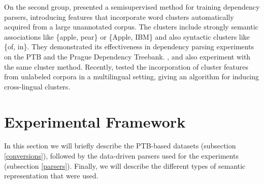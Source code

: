 \documentclass[11pt]{article}
\begin{document}
On the second group,  presented a semisupervised method for training dependency parsers, introducing features that incorporate word clusters automatically acquired from a large unannotated corpus. The clusters include strongly semantic associations like \{apple, pear\} or \{Apple, IBM\} and also syntactic clusters like \{of, in\}. They demonstrated its effectiveness in  dependency parsing experiments on the PTB and the Prague Dependency Treebank.
,  and  also experiment with the same cluster method.
Recently,  tested the incorporation of 
cluster features from unlabeled corpora in a multilingual setting, giving an algorithm for inducing cross-lingual clusters.




\section{Experimental Framework}\label{framework}
In this section we will briefly describe the PTB-based datasets (subsection \ref{conversions}), followed by the data-driven parsers used for the experiments  (subsection \ref{parsers}). Finally, we will describe the different types of semantic representation that were used. 
\end{document}
